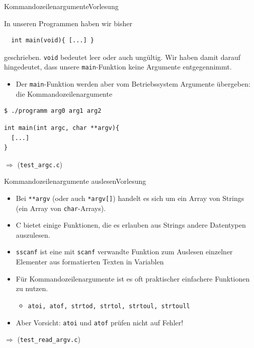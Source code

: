 \documentclass[xcolor=dvipsnames]{beamer}
\newcounter{lecturecounter}
\begin{document}
\begin{frame}[fragile]{Kommandozeilenargumente}{Vorlesung }
\begin{block}{}
  In unseren Programmen haben wir bisher
\end{block}
\begin{lstlisting}
  int main(void){ [...] } 
\end{lstlisting}
\begin{block}{}
  geschrieben. \texttt{void} bedeutet leer oder auch ungültig. Wir haben damit darauf hingedeutet, dass unsere \texttt{main}-Funktion keine Argumente entgegennimmt.
  \begin{itemize}
    \item{Der \texttt{main}-Funktion werden aber vom Betriebssystem Argumente übergeben: die Kommandozeilenargumente}
  \end{itemize}
\begin{verbatim}
$ ./programm arg0 arg1 arg2
\end{verbatim}
\begin{lstlisting}
int main(int argc, char **argv){
  [...]
}
\end{lstlisting}

\end{block}
$\Rightarrow$ (\texttt{test\_argc.c})
\end{frame}

\begin{frame}[fragile]{Kommandozeilenargumente auslesen}{Vorlesung }
  \begin{block}{}
    \begin{itemize}
      \item{Bei \texttt{**argv} (oder auch \texttt{*argv[]}) handelt es sich um ein Array von Strings (ein Array von \texttt{char}-Arrays).}
      \item{C bietet einige Funktionen, die es erlauben aus Strings andere Datentypen auszulesen.}
      \item{\texttt{sscanf} ist eine mit \texttt{scanf} verwandte Funktion zum Auslesen einzelner Elementer aus formatierten Texten in Variablen}
      \item{Für Kommandozeilenargumente ist es oft praktischer einfachere Funktionen zu nutzen.}
      \begin{itemize}
        \item{\verb|atoi, atof, strtod, strtol, strtoul, strtoull|}
      \end{itemize}
      \item{Aber Vorsicht: \texttt{atoi} und \texttt{atof} prüfen nicht auf Fehler!\n}
    \end{itemize}
  \end{block}
  $\Rightarrow$ (\texttt{test\_read\_argv.c})
\end{frame}
\end{document}
